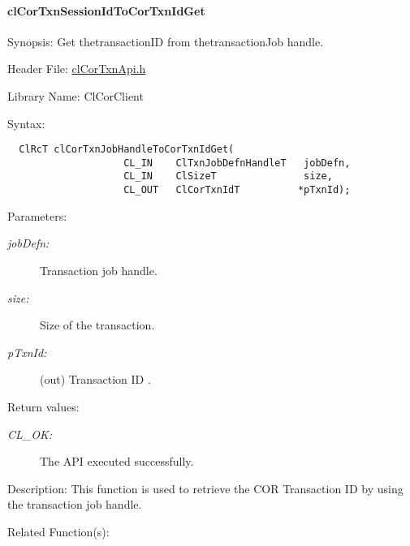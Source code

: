 \hypertarget{pagecor504}{}\paragraph{cl\-Cor\-Txn\-Session\-Id\-To\-Cor\-Txn\-Id\-Get}\label{pagecor504}
\begin{Desc}
\item[Synopsis:]Get thetransaction\-ID from thetransaction\-Job handle.\end{Desc}
\begin{Desc}
\item[Header File:]\hyperlink{cl_cor_txn_api_8h}{cl\-Cor\-Txn\-Api.h}\end{Desc}
\begin{Desc}
\item[Library Name:]Cl\-Cor\-Client\end{Desc}
\begin{Desc}
\item[Syntax:]

\footnotesize\begin{verbatim}  ClRcT clCorTxnJobHandleToCorTxnIdGet(
                    CL_IN    ClTxnJobDefnHandleT   jobDefn,
                    CL_IN    ClSizeT               size,
                    CL_OUT   ClCorTxnIdT          *pTxnId);
\end{verbatim}
\normalsize
\end{Desc}
\begin{Desc}
\item[Parameters:]
\begin{description}
\item[{\em job\-Defn:}]Transaction job handle. \item[{\em size:}]Size of the transaction. \item[{\em p\-Txn\-Id:}](out) Transaction ID .\end{description}
\end{Desc}
\begin{Desc}
\item[Return values:]
\begin{description}
\item[{\em CL\_\-OK:}]The API executed successfully.\end{description}
\end{Desc}
\begin{Desc}
\item[Description:]This function is used to retrieve the COR Transaction ID by using the transaction job handle.\end{Desc}
\begin{Desc}
\item[Related Function(s):]\end{Desc}
